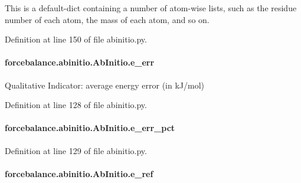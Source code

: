 This is a default-\/dict containing a number of atom-\/wise lists, such as the residue number of each atom, the mass of each atom, and so on. 



Definition at line 150 of file abinitio.\-py.

\hypertarget{classforcebalance_1_1abinitio_1_1AbInitio_aa569290969858e189935b3de37ead3f0}{
\paragraph[{e\-\_\-err}]{\setlength{\rightskip}{0pt plus 5cm}forcebalance.\-abinitio.\-Ab\-Initio.\-e\-\_\-err}}\label{classforcebalance_1_1abinitio_1_1AbInitio_aa569290969858e189935b3de37ead3f0}


Qualitative Indicator\-: average energy error (in k\-J/mol) 



Definition at line 128 of file abinitio.\-py.

\hypertarget{classforcebalance_1_1abinitio_1_1AbInitio_a4e3e525a03ab55bc004ebf0e3a0d60ce}{
\paragraph[{e\-\_\-err\-\_\-pct}]{\setlength{\rightskip}{0pt plus 5cm}forcebalance.\-abinitio.\-Ab\-Initio.\-e\-\_\-err\-\_\-pct}}\label{classforcebalance_1_1abinitio_1_1AbInitio_a4e3e525a03ab55bc004ebf0e3a0d60ce}


Definition at line 129 of file abinitio.\-py.

\hypertarget{classforcebalance_1_1abinitio_1_1AbInitio_a71d13d3fabd98146c68bb5fc784f6732}{
\paragraph[{e\-\_\-ref}]{\setlength{\rightskip}{0pt plus 5cm}forcebalance.\-abinitio.\-Ab\-Initio.\-e\-\_\-ref}}\label{classforcebalance_1_1abinitio_1_1AbInitio_a71d13d3fabd98146c68bb5fc784f6732}


